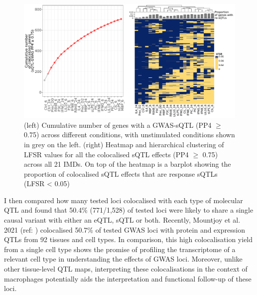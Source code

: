 \begin{figure}[H]
  \centering
  \includegraphics[width=\textwidth]{coloc_cum_response_sqtl}
  \caption[Condition-specificity of colocalised sQTLs]{(left) Cumulative number of genes with a GWAS-sQTL (PP4 $\geq$ 0.75) across different conditions, with unstimulated conditions shown in grey on the left. (right) Heatmap and hierarchical clustering of LFSR values for all the colocalised sQTL effects (PP4 $\geq$ 0.75) across all 21 IMDs. On top of the heatmap is a barplot showing the proportion of colocalised sQTL effects that are response sQTLs (LFSR < 0.05)}
  \label{fig:coloc_cum_response_sqtl}   
\end{figure}
I then compared how many tested loci colocalised with each type of molecular QTL and found that 50.4\% (771/1,528) of tested loci were likely to share a single causal variant with either an eQTL, sQTL or both. Recently, Mountjoy et al. 2021 (ref: \cite{Mountjoy2021-fc}) colocalised 50.7\% of tested GWAS loci with protein and expression QTLs from 92 tissues and cell types. In comparison, this high colocalisation yield from a single cell type shows the promise of profiling the transcriptome of a relevant cell type in understanding the effects of GWAS loci. Moreover, unlike other tissue-level QTL maps, interpreting these colocalisations in the context of macrophages potentially aids the interpretation and functional follow-up of these loci. \\

